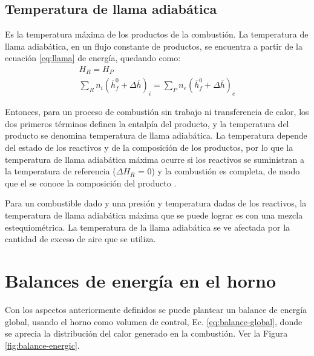 \subsection{Temperatura de llama adiabática}
\par Es la temperatura máxima de los productos de la combustión. La temperatura de llama adiabática, en un flujo constante de productos, se encuentra a partir de la ecuación \ref{eq:llama} de energía, quedando como:
\begin{equation} \label{eq:llama}
\begin{gathered}
    H_R = H_P \\
    \sum_R n_i (\bar h^0_{f} + \Delta \bar h)_{i} = \sum_P n_e (\bar h^0_{f} + \Delta \bar h)_{e}
\end{gathered}
\end{equation}
\par Entonces, para un proceso de combustión sin trabajo ni transferencia de calor, los dos primeros términos definen la entalpía del producto, y la temperatura del producto se denomina temperatura de llama adiabática. La temperatura depende del estado de los reactivos y de la composición de los productos, por lo que la temperatura de llama adiabática máxima ocurre si los reactivos se suministran a la temperatura de referencia ($\Delta H_R$ = 0) y la combustión es completa, de modo que el se conoce la composición del producto \cite{bib:vanwylen}.
\par Para un combustible dado y una presión y temperatura dadas de los reactivos, la temperatura de llama adiabática máxima que se puede lograr es con una mezcla estequiométrica. La temperatura de la llama adiabática se ve afectada por la cantidad de exceso de aire que se utiliza.

\section{Balances de energía en el horno}
\par Con los aspectos anteriormente definidos se puede plantear un balance de energía global, usando el horno como volumen de control, Ec. \ref{eq:balance-global}, donde se aprecia la distribución del calor generado en la combustión. Ver la Figura \ref{fig:balance-energic}.

